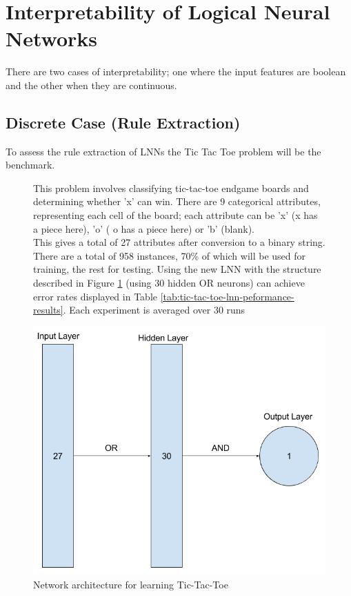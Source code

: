 \section{Interpretability of Logical Neural Networks}
There are two cases of interpretability; one where the input features are boolean and the other when they are continuous.

\subsection{Discrete Case (Rule Extraction)}
To assess the rule extraction of LNNs the Tic Tac Toe  \cite{Lichman:2013} problem will be the benchmark. 


\begin{figure}[H]
	\centering
	\begin{minipage}[t]{0.5\textwidth}
		\vspace{0px}
		This problem involves classifying tic-tac-toe endgame boards and determining whether 'x' can win. There are 9 categorical attributes, representing each cell of the board; each attribute can be 'x' (x has a piece here), 'o' ( o has a piece here) or 'b' (blank).\\
	
		This gives a total of 27 attributes after conversion to a binary string. There are a total of 958 instances, 70\% of which will be used for training, the rest for testing.  Using the new LNN with the structure described in Figure \ref{fig:tic-tac-toe-net} (using 30 hidden OR neurons) can achieve error rates displayed in Table \ref{tab:tic-tac-toe-lnn-peformance-results}. Each experiment is averaged over 30 runs
	\end{minipage}
	\hspace{1px}
	\begin{minipage}[t]{0.48\textwidth}
		\vspace{0px}
		\includegraphics[width=\textwidth]{Tic-Tac-Toe-Net.png}
		\caption{Network architecture for learning Tic-Tac-Toe}
		\label{fig:tic-tac-toe-net}
	\end{minipage}
	\hfill
\end{figure}



